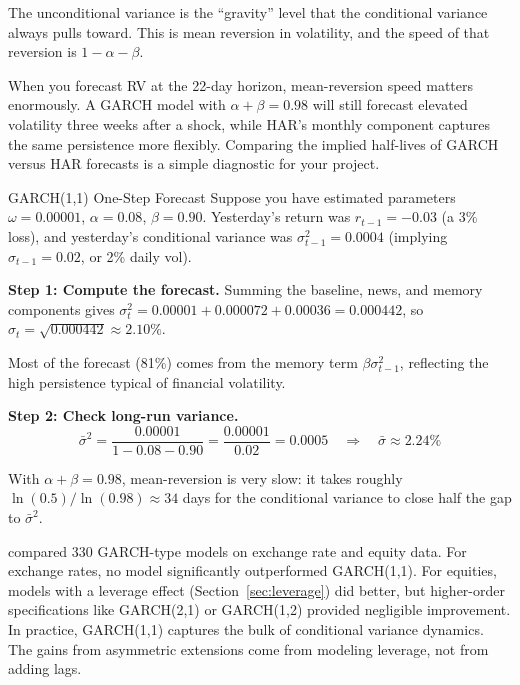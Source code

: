 \begin{intuition}
The unconditional variance is the ``gravity'' level that the conditional variance
always pulls toward. This is mean reversion in volatility, and the speed of that
reversion is $1 - \alpha - \beta$.
\end{intuition}

\begin{projectconnection}
When you forecast RV at the 22-day horizon, mean-reversion speed matters enormously.
A GARCH model with $\alpha + \beta = 0.98$ will still forecast elevated volatility
three weeks after a shock, while HAR's monthly component captures the same
persistence more flexibly. Comparing the implied half-lives of GARCH versus HAR
forecasts is a simple diagnostic for your project.
\end{projectconnection}

\begin{workedexample}{GARCH(1,1) One-Step Forecast}
\label{ex:garch11-calc}
Suppose you have estimated parameters $\omega = 0.00001$, $\alpha = 0.08$,
$\beta = 0.90$. Yesterday's return was $r_{t-1} = -0.03$ (a 3\% loss), and
yesterday's conditional variance was $\sigma^2_{t-1} = 0.0004$
(implying $\sigma_{t-1} = 0.02$, or 2\% daily vol).

\textbf{Step 1: Compute the forecast.}
Summing the baseline, news, and memory components gives
$\sigma^2_t = 0.00001 + 0.000072 + 0.00036 = 0.000442$, so
$\sigma_t = \sqrt{0.000442} \approx 2.10\%$.

Most of the forecast (81\%) comes from the
memory term $\beta \sigma^2_{t-1}$, reflecting the high persistence typical of
financial volatility.

\textbf{Step 2: Check long-run variance.}
%
\[
\bar{\sigma}^2 = \frac{0.00001}{1 - 0.08 - 0.90}
  = \frac{0.00001}{0.02} = 0.0005
\quad\Rightarrow\quad
\bar{\sigma} \approx 2.24\%
\]

With $\alpha + \beta = 0.98$, mean-reversion is very slow: it takes roughly
$\ln(0.5)/\ln(0.98) \approx 34$ days for the conditional variance to close half
the gap to $\bar{\sigma}^2$.
\end{workedexample}

\begin{keyidea}
\label{idea:garch11-enough}
\citet{hansen2005forecast} compared 330 GARCH-type models on exchange rate and
equity data. For exchange rates, no model significantly outperformed GARCH(1,1). For
equities, models with a leverage effect (Section~\ref{sec:leverage}) did better, but
higher-order specifications like GARCH(2,1) or GARCH(1,2) provided negligible
improvement. In practice, GARCH(1,1) captures the bulk of conditional variance
dynamics. The gains from asymmetric extensions come from modeling leverage, not from
adding lags.
\end{keyidea}



